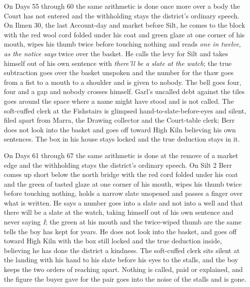 \documentclass{design/chronicle}
\begin{document}
{On Days 55 through 60 the same arithmetic is done once more over a body the Court has not entered and the withholding stays the district’s ordinary speech. On Ilmen 30, the last Account-day and market before Silt, he comes to the block with the red wool cord folded under his coat and green glaze at one corner of his mouth, wipes his thumb twice before touching nothing and reads \emph{one in twelve, as the notice says} twice over the basket. He calls the levy for Silt and takes himself out of his own sentence with \emph{there’ll be a slate at the watch}; the true subtraction goes over the basket unspoken and the number for the thaw goes from a fist to a mouth to a shoulder and is given to nobody. The bell goes four, four and a gap and nobody crosses himself. Garl’s uncalled debt against the tiles goes around the space where a name might have stood and is not called. The soft-cuffed clerk at the Fishstairs is glimpsed hand-to-slate-before-eyes and silent, filed apart from Marra, the Drawing collector and the Court-table clerk; Berr does not look into the basket and goes off toward High Kiln believing his own sentences. The box in his house stays locked and the true deduction stays in it.

On Days 61 through 67 the same arithmetic is done at the remove of a market edge and the withholding stays the district’s ordinary speech. On Silt 2 Berr comes up short below the north bridge with the red cord folded under his coat and the green of tasted glaze at one corner of his mouth, wipes his thumb twice before touching nothing, holds a narrow slate unopened and passes a finger over what is written. He says a number goes into a slate and not into a well and that there will be a slate at the watch, taking himself out of his own sentence and never saying \emph{I}; the green at his mouth and the twice-wiped thumb are the same tells the boy has kept for years. He does not look into the basket, and goes off toward High Kiln with the box still locked and the true deduction inside, believing he has done the district a kindness. The soft-cuffed clerk sits silent at the landing with his hand to his slate before his eyes to the stalls, and the boy keeps the two orders of reaching apart. Nothing is called, paid or explained, and the figure the buyer gave for the pair goes into the noise of the stalls and is gone.

}
\end{document}
